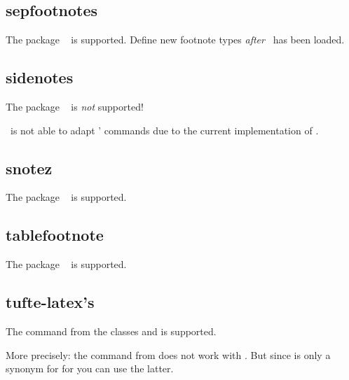 \documentclass{fnpct-manual}
\begin{document}
\subsection{sepfootnotes}\label{sec:sepfootnotes}
The package ~\cite{pkg:sepfootnotes} is supported.  Define
new footnote types \emph{after} \fnpct\ has been loaded.

\subsection{sidenotes}\label{sec:sidenotes}
\begin{bewareofthedog}
  The package ~\cite{pkg:sidenotes} is \emph{not} supported!
\end{bewareofthedog}
\fnpct\ is not able to adapt ' commands due to the current
implementation of .

\subsection{snotez}\label{sec:snotez}
The package ~\cite{pkg:snotez} is supported.

\subsection{tablefootnote}\label{sec:tablefootnote}
The package ~\cite{pkg:tablefootnote} is supported.


\subsection{tufte-latex's }\label{sec:tufte}
The  command from the  classes
 and  is supported.


More precisely: the  command from  does not
work with . But since  is only a synonym for
 for  you can use the latter.
\end{document}
